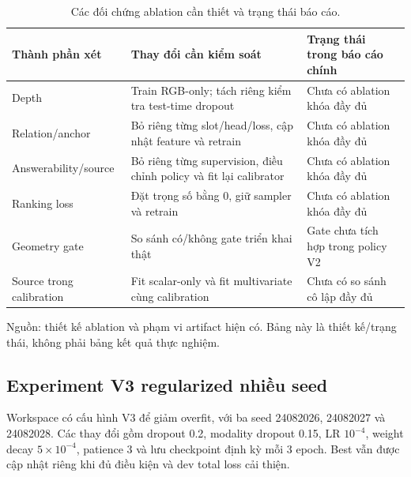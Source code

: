 \begin{table}[htbp]
    \centering
    \setlength{\tabcolsep}{4pt}
    \renewcommand{\arraystretch}{1.15}
    \caption{Các đối chứng ablation cần thiết và trạng thái báo cáo.}
    \label{tab:setup-ablation-plan}
    \small
    \begin{tabularx}{\textwidth}{@{}>{\raggedright\arraybackslash}p{}>{\raggedright\arraybackslash}p{}>{\raggedright\arraybackslash}X@{}}
        \toprule
        Thành phần xét & Thay đổi cần kiểm soát &
        Trạng thái trong báo cáo chính \\
        \midrule
        Depth & Train RGB-only; tách riêng
        kiểm tra test-time dropout & Chưa có ablation khóa đầy đủ \\
        Relation/anchor & Bỏ riêng từng slot/head/loss,
        cập nhật feature và retrain & Chưa có ablation khóa đầy đủ \\
        Answerability/source & Bỏ riêng từng supervision,
        điều chỉnh policy và fit lại calibrator & Chưa có ablation khóa đầy đủ \\
        Ranking loss & Đặt trọng số bằng 0,
        giữ sampler và retrain & Chưa có ablation khóa đầy đủ \\
        Geometry gate & So sánh có/không gate
        triển khai thật & Gate chưa tích hợp trong policy V2 \\
        Source trong calibration & Fit scalar-only và
        fit multivariate cùng calibration & Chưa có so sánh
        cô lập đầy đủ \\
        \bottomrule
    \end{tabularx}
    \vspace{2pt}
    {\footnotesize\raggedright Nguồn: thiết kế ablation và phạm vi
    artifact hiện có. Bảng này là thiết kế/trạng thái,
    không phải bảng kết quả thực nghiệm.\par}
\end{table}

\subsection{Experiment V3 regularized nhiều seed}

Workspace có cấu hình V3 để giảm overfit, với ba seed
24082026, 24082027 và 24082028. Các thay đổi gồm dropout
0.2, modality dropout 0.15, LR $10^{-4}$, weight decay
$5\times10^{-4}$, patience 3 và lưu checkpoint định kỳ
mỗi 3 epoch. Best vẫn được cập nhật riêng khi đủ điều
kiện và dev total loss cải thiện.

